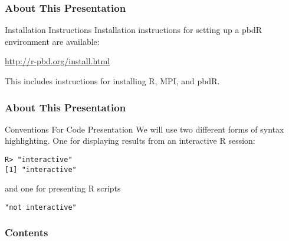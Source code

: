 \begin{frame}
\frametitle{About This Presentation}
 \begin{block}{Installation Instructions}
  Installation instructions for setting up a pbdR environment are available:
  \begin{center}
  \url{http://r-pbd.org/install.html}
  \end{center}
  This includes instructions for installing R, MPI, and pbdR.
 \end{block}
\end{frame}





\begin{frame}[fragile]
\frametitle{About This Presentation}
 \begin{block}{Conventions For Code Presentation}
We will use two different forms of syntax highlighting.  One for displaying results from an interactive R session:
\begin{lstlisting}[backgroundcolor=\color{white},basicstyle=\ttfamily\color{dkgray}\scriptsize,keywordstyle=\color{black}, 
  commentstyle=\color{orange},stringstyle=\color{mauve}]
R> "interactive"
[1] "interactive"
\end{lstlisting}
and one for presenting R scripts
\begin{lstlisting}
"not interactive"
\end{lstlisting}
 \end{block}
\end{frame}



\begin{frame}
\frametitle{Contents}
\small
\tableofcontents[hideallsubsections]
\end{frame}

\setcounter{framenumber}{0}

